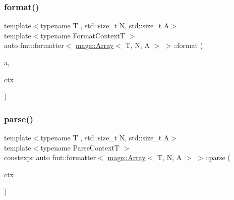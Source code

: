 \subsubsection{\texorpdfstring{format()}{format()}}
{\footnotesize\ttfamily template$<$typename T , std\+::size\+\_\+t N, std\+::size\+\_\+t A$>$ \\
template$<$typename Format\+ContextT $>$ \\
auto fmt\+::formatter$<$ \mbox{\hyperlink{structmage_1_1_array}{mage\+::\+Array}}$<$ T, N, A $>$ $>$\+::format (\begin{DoxyParamCaption}\item[{const \mbox{\hyperlink{structmage_1_1_array}{mage\+::\+Array}}$<$ T, N, A $>$ \&}]{a,  }\item[{Format\+ContextT \&}]{ctx }\end{DoxyParamCaption})}

\mbox{\label{structfmt_1_1formatter_3_01mage_1_1_array_3_01_t_00_01_n_00_01_a_01_4_01_4_a39b2d7f0cc3c82228f5ad09dedee4a43}} 
\subsubsection{\texorpdfstring{parse()}{parse()}}
{\footnotesize\ttfamily template$<$typename T , std\+::size\+\_\+t N, std\+::size\+\_\+t A$>$ \\
template$<$typename Parse\+ContextT $>$ \\
constexpr auto fmt\+::formatter$<$ \mbox{\hyperlink{structmage_1_1_array}{mage\+::\+Array}}$<$ T, N, A $>$ $>$\+::parse (\begin{DoxyParamCaption}\item[{Parse\+ContextT \&}]{ctx }\end{DoxyParamCaption})}

